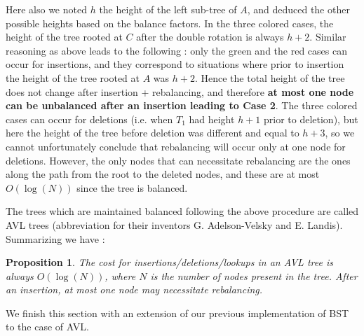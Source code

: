\documentclass[12pt]{article}
\theoremstyle{plain}
\newtheorem{proposition}{Proposition}
\theoremstyle{remark}
\begin{document}
Here also we noted $h$ the height of the left sub-tree of $A$, and deduced the
other possible heights based on the balance factors. In the three colored cases,
the height of the tree rooted at $C$ after the double rotation is always 
$h + 2$.  Similar reasoning as above leads to the following :  only the green
and the red cases can occur for insertions, and they correspond to situations
where prior to insertion the height of the tree rooted at $A$ was $h+2$. Hence
the total height of the tree does not change after insertion + rebalancing, and
therefore {\bf at most one node can be unbalanced after an insertion
leading to Case 2}. The three colored cases can occur for deletions (i.e. when 
$T_1$ had height $h+1$ prior to deletion), but here the height of the tree
before deletion was different and equal to $h+3$, so we cannot unfortunately
conclude that rebalancing will occur only at one node for deletions. However,
the only nodes that can necessitate rebalancing are the ones along the path from
the root to the deleted nodes, and these are at most $O(\log(N))$ since the tree
is balanced.

\medskip

The trees which are maintained balanced following the above procedure are called
AVL trees (abbreviation for their inventors G. Adelson-Velsky and E. Landis).
Summarizing we have :

\begin{proposition}
	The cost for insertions/deletions/lookups in an AVL tree is always
	$O(\log(N))$, where $N$ is the number of nodes present in the tree.
	After an insertion, at most one node may necessitate rebalancing.
\end{proposition}

We finish this section with an extension of our previous implementation of BST
to the case of AVL.
\end{document}
